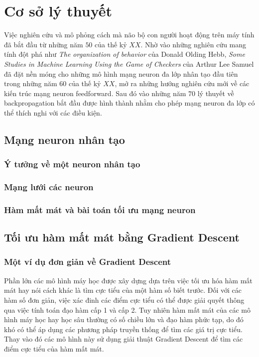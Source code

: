 \chapter{Cơ sở lý thuyết}
Việc nghiên cứu và mô phỏng cách mà não bộ con người hoạt động trên máy tính đã bắt đầu từ những năm $50$ của thế kỷ $XX$. Nhờ vào những nghiên cứu mang tính đột phá như \textit{The organization of behavior}\cite{Hebb:1949} của Donald Olding Hebb, \textit{Some Studies in Machine Learning Using the Game of Checkers}\cite{Arthur:1959:IBM} của Arthur Lee Samuel đã đặt nền móng cho những mô hình mạng neuron đa lớp nhân tạo đầu tiên trong những năm $60$ của thế kỷ $XX$, mở ra những hướng nghiên cứu mới về các kiến trúc mạng neuron feedforward. Sau đó vào những năm $70$ lý thuyết về backpropagation bắt đầu được hình thành nhằm cho phép mạng neuron đa lớp có thể thích nghi với các điều kiện. 
\section{Mạng neuron nhân tạo}
\subsection{Ý tưởng về một neuron nhân tạo}
\subsection{Mạng lưới các neuron}
\subsection{Hàm mất mát và bài toán tối ưu mạng neuron}
\section{Tối ưu hàm mất mát bằng Gradient Descent}
\subsection{Một ví dụ đơn giản về Gradient Descent}
Phần lớn các mô hình máy học được xây dựng dựa trên việc tối ưu hóa hàm mất mát hay nói cách khác là tìm cực tiểu của một hàm số biết trước. Đối với các hàm số đơn giản, việc xác đinh các điểm cực tiểu có thể được giải quyết thông qua việc tính toán đạo hàm cấp 1 và cấp 2. Tuy nhiên hàm mất mát của các mô hình máy học hay học sâu thường có số chiều lớn và đạo hàm phức tạp, do đó khó có thể áp dụng các phương pháp truyền thống để tìm các giá trị cực tiểu. Thay vào đó các mô hình này sử dụng giải thuật Gradient Descent để tìm các điểm cực tiểu của hàm mất mát.

